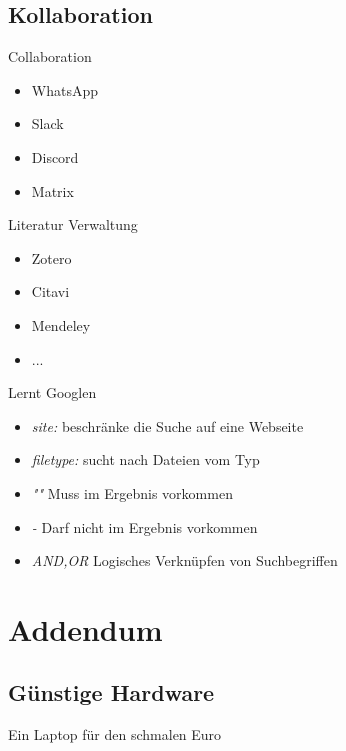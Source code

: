 \documentclass[aspectratio=169,shownotes]{beamer}
\begin{document}
\subsection{Kollaboration}


\begin{frame}{Collaboration}
    \begin{itemize}
        \item WhatsApp
        \item Slack
        \item Discord
        \item Matrix        
    \end{itemize}
\end{frame}


\begin{frame}{Literatur Verwaltung}
    \begin{itemize}
        \item Zotero
        \item Citavi
        \item Mendeley
        \item ...
    \end{itemize}    
\end{frame}

\begin{frame}{Lernt Googlen}
    \begin{itemize}
        \item \textit{site:} beschränke die Suche auf eine Webseite
        \item \textit{filetype:} sucht nach Dateien vom Typ
        \item \textit{""}  Muss im Ergebnis vorkommen
        \item \textit{-} Darf nicht im Ergebnis vorkommen
        \item \textit{AND,OR} Logisches Verknüpfen von Suchbegriffen
    \end{itemize}
\end{frame}


\section{Addendum}
\subsection{Günstige Hardware}
\begin{frame}{Ein Laptop für den schmalen Euro}
    
\end{frame}
\end{document}
